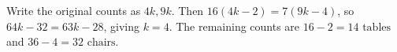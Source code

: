 Write the original counts as $4k,9k$. Then $16(4k-2)=7(9k-4)$, so $64k-32=63k-28$, giving $k=4$. The remaining counts are $16-2=\boxed{14\text{ tables}}$ and $36-4=\boxed{32\text{ chairs}}$.

